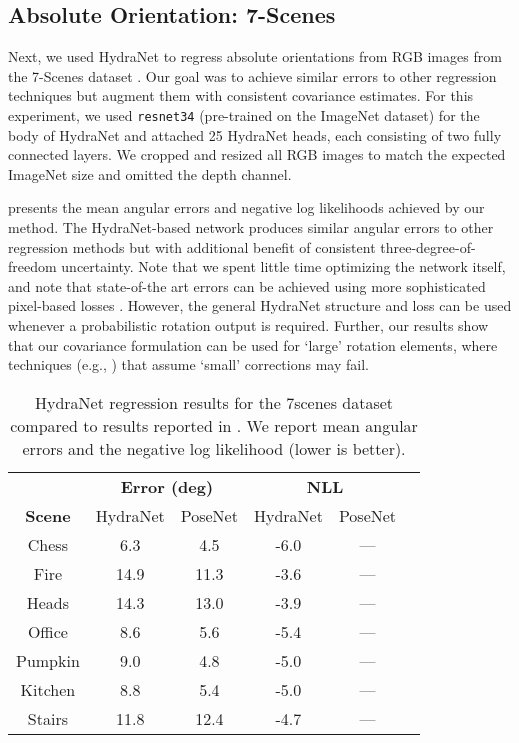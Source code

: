 \subsection{Absolute Orientation: 7-Scenes}
Next, we used HydraNet to regress absolute orientations from RGB images from the 7-Scenes dataset \citep{Glocker7scenes}. Our goal was to achieve similar errors to other regression techniques \citep{Kendall2017-ud} but augment them with consistent covariance estimates. For this experiment, we used \texttt{resnet34} \citep{he2016deep} (pre-trained on the ImageNet dataset) for the body of HydraNet and attached 25 HydraNet heads, each consisting of two fully connected layers. We cropped and resized all RGB images to match the expected ImageNet size and omitted the depth channel.

 presents the mean angular errors and negative log likelihoods achieved by our method. The HydraNet-based network produces similar angular errors to other regression methods \citep{Kendall2017-ud} but with additional benefit of consistent three-degree-of-freedom uncertainty. Note that we spent little time optimizing the network itself, and note that state-of-the art errors can be achieved using more sophisticated pixel-based losses \citep{Brachmann2018-us}. However, the general HydraNet structure and loss can be used whenever a probabilistic rotation output is required. Further, our results show that our covariance formulation can be used for `large' rotation elements, where techniques (e.g., \citep{2018_Peretroukhin_Deep}) that assume `small' corrections may fail.

\begin{table}[]
	\caption{HydraNet regression results for the 7scenes dataset compared to results reported in \citep{Kendall2017-ud}. We report mean angular errors and the negative log likelihood (lower is better).}
	\centering
	\begin{threeparttable}
	\begin{tabular}{cccccc}
		\toprule
		& \multicolumn{2}{c}{\textbf{Error (deg)}} & \multicolumn{2}{c}{\textbf{NLL}} \\ \cmidrule{2-5} 
		\textbf{Scene} & HydraNet & PoseNet & HydraNet & PoseNet \\ \midrule
		Chess & 6.3 & 4.5 & -6.0 & --- \\
		Fire & 14.9 & 11.3 & -3.6 & --- \\
		Heads & 14.3 & 13.0 & -3.9 & --- \\
		Office & 8.6 & 5.6 & -5.4 & --- \\
		Pumpkin & 9.0 & 4.8 & -5.0 & --- \\
		Kitchen & 8.8 & 5.4 & -5.0 & --- \\
		Stairs & 11.8 & 12.4 & -4.7 & --- \\ \bottomrule
	\end{tabular}
\end{threeparttable}
\label{tab:7scenes_stats}
\end{table}


